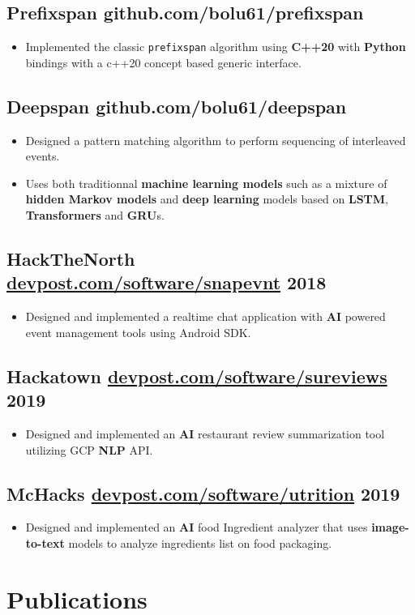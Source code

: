 \documentclass[10pt,letterpaper]{article}
\newcommand{\datedsubsection}[2]{\subsection[#1]{#1 \hfill #2}}
\renewcommand{\emph}[1]{{\color{emphcolor}\bfseries#1}}
\begin{document}
\subsection{Prefixspan github.com/bolu61/prefixspan}
\begin{itemize}
    \item Implemented the classic \verb|prefixspan| algorithm using \emph{C++20}
    with \emph{Python} bindings with a c++20 concept based generic interface.
\end{itemize}
\subsection{Deepspan github.com/bolu61/deepspan}
\begin{itemize}
    \item Designed a pattern matching algorithm to perform sequencing of interleaved events.
    \item Uses both traditionnal \emph{machine learning models} such as a
    mixture of \emph{hidden Markov models} and \emph{deep learning} models based
    on \emph{LSTM}, \emph{Transformers} and \emph{GRU}s.
\end{itemize}

\datedsubsection{HackTheNorth \href{https://devpost.com/software/snapevnt}{devpost.com/software/snapevnt}}{2018}
\begin{itemize}
    \item Designed and implemented a realtime chat application with \emph{AI} powered
    event management tools using Android SDK.
\end{itemize}
\datedsubsection{Hackatown \href{https://devpost.com/software/sureviews}{devpost.com/software/sureviews}}{2019}
\begin{itemize}
    \item Designed and implemented an \emph{AI} restaurant review summarization
    tool utilizing GCP \emph{NLP} API.
\end{itemize}
\datedsubsection{McHacks \href{https://devpost.com/software/utrition}{devpost.com/software/utrition}}{2019}
\begin{itemize}
    \item Designed and implemented an \emph{AI} food Ingredient analyzer that
    uses \emph{image-to-text} models to analyze ingredients list on food
    packaging.
\end{itemize}

\section{Publications}
\end{document}

